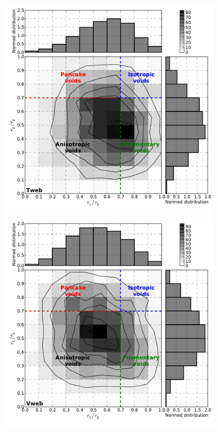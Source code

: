 \documentclass[a4,useAMS,usenatbib,usegraphicx]{latex/mn2e}
\begin{document}
\begin{flushleft}
\begin{figure}
\begin{center}

  \includegraphics[trim = 7mm 9mm 1mm 0mm, clip, keepaspectratio=true,
  width=0.36\textheight]{./figures/voids_inertia_tensor_Tweb}
  \includegraphics[trim = 7mm 9mm 1mm 0mm, clip, keepaspectratio=true,
  width=0.36\textheight]{./figures/voids_inertia_tensor_Vweb}


\end{center}
\end{figure}
\end{flushleft}
\end{document}
